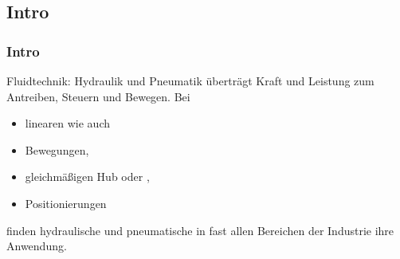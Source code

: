 \subsection{Intro}
\begin{frame}
  \frametitle{Intro}
  \vspace{-0.3\baselineskip}
  Fluidtechnik: Hydraulik und Pneumatik überträgt Kraft und Leistung zum Antreiben, Steuern und 
  Bewegen. Bei 
  \begin{itemize}
    \item  linearen wie auch 
    \item  {} Bewegungen, 
    \item  gleichmäßigen Hub oder , 
    \item  Positionierungen 
  \end{itemize}
  finden hydraulische und pneumatische 
   in fast allen Bereichen der Industrie ihre Anwendung.
  
   \ifteacher%
   \else%
     \vspace*{-1.0\baselineskip}\rotatebox[origin=lB]{180}{%
     \resizebox{0.9\linewidth}{!}{\parbox[t]{3.95\linewidth}{%
       rotatorischen, Senkbewegungen, Komponenten
     }}}
   \fi%

\end{frame}

